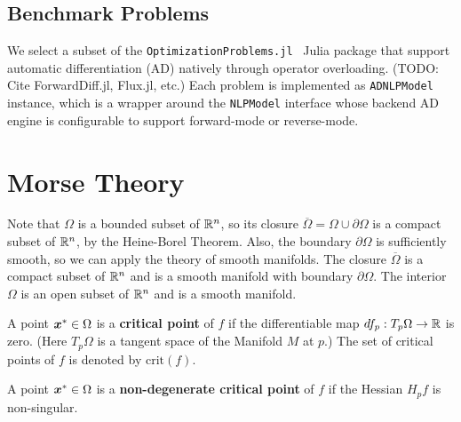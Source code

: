 \documentclass[10pt]{article}
\begin{document}
        \medskip
    

    \subsection{Benchmark Problems}
        \label{intro:problems}
        We select a subset of the \texttt{OptimizationProblems.jl}~\cite{OptimizationProblems}
        Julia package that support automatic differentiation (AD) natively through operator
        overloading. (TODO: Cite ForwardDiff.jl, Flux.jl, etc.) Each problem is implemented
        as \texttt{ADNLPModel} instance, which is a wrapper around the \texttt{NLPModel} interface
        whose backend AD engine is configurable to support forward-mode or reverse-mode.



\section{Morse Theory}
    \label{sec:theory}
    
    \medskip

    Note that $\Omega$ is a bounded subset of $\mathbb{R}^n$, so its closure
    $\overline{\Omega} = \Omega \cup \partial \Omega$ is a compact subset
    of $\mathbb{R}^n$, by the Heine-Borel Theorem.
    Also, the boundary $\partial \Omega$ is sufficiently smooth,
    so we can apply the theory of smooth manifolds.
    The closure $\overline{\Omega}$ is a compact subset of $\mathbb{R}^n$ and
    is a smooth manifold with boundary $\partial \Omega$.
    The interior $\Omega$ is an open subset of $\mathbb{R}^n$ and is a smooth manifold.\\


    \begin{definition}
            A point $\bm{x}^* \in \Omega$ is a \textbf{critical point} of $f$ if the
            differentiable map $df_p: T_p \Omega \rightarrow \mathbb{R}$ is zero. (Here
            $T_p \Omega$ is a tangent space of the Manifold $M$ at $p$.) 
            The set of critical points of $f$ is denoted by $\text{crit}(f)$.
    \end{definition}

    \begin{definition}
            A point $\bm{x}^* \in \Omega$ is a \textbf{non-degenerate critical point} of $f$ if
            the Hessian $H_p f$ is non-singular.
    \end{definition}
\end{document}
